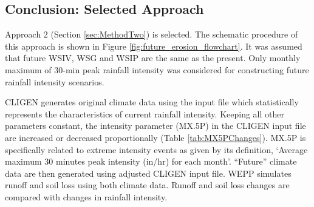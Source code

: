 
\subsection{Conclusion: Selected Approach}
\label{sec:SelectedMethod}

Approach 2 (Section \ref{sec:MethodTwo}) is selected. The schematic
procedure of this approach is shown in Figure
\ref{fig:future_erosion_flowchart}.
It was assumed that future WSIV, WSG and WSIP are the same as the present. Only
monthly maximum of 30-min peak rainfall intensity was considered for
constructing future rainfall intensity scenarios.

CLIGEN generates original climate data using the input file which statistically
represents the characteristics of current rainfall intensity. Keeping all other
parameters constant, the intensity parameter ({MX.5P}) in the CLIGEN input file
are increased or decreased proportionally (Table \ref{tab:MX5PChanges}).
{MX.5P} is specifically related to extreme intensity events as given by its
definition, `Average maximum 30 minutes peak intensity (in/hr) for each month'.
``Future'' climate data are then generated using adjusted CLIGEN input file.
WEPP simulates runoff and soil loss using both climate data. Runoff and soil
loss changes are compared with changes in rainfall intensity.

